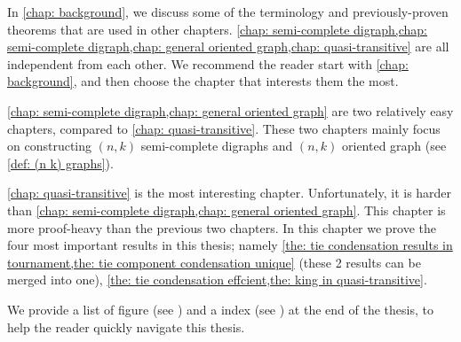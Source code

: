 In \cref{chap: background}, we discuss some of the terminology
and previously-proven theorems that are used in other chapters.
\cref{chap: semi-complete digraph,chap: semi-complete digraph,chap: general oriented graph,chap: quasi-transitive}
are all independent from each other.
We recommend the reader start with \cref{chap: background},
and then choose the chapter that interests them the most.

\cref{chap: semi-complete digraph,chap: general oriented graph}
are two relatively easy chapters, compared to \cref{chap: quasi-transitive}.
These two chapters mainly focus on constructing
\((n, k)\) semi-complete digraphs and
\((n, k)\) oriented graph (see \cref{def: (n k) graphs}).

\cref{chap: quasi-transitive} is the most interesting chapter.
Unfortunately, it is harder than
\cref{chap: semi-complete digraph,chap: general oriented graph}.
This chapter is more proof-heavy than the previous two chapters.
In this chapter we prove the four most important results
in this thesis; namely
\cref{the: tie condensation results in tournament,the: tie component condensation unique}
(these 2 results can be merged into one),
\cref{the: tie condensation effcient,the: king in quasi-transitive}.

We provide a list of figure (see )
and a index (see ) at the end of the thesis,
to help the reader quickly navigate this thesis.
